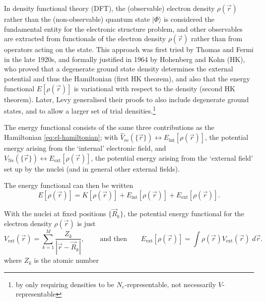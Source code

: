 \documentclass[11pt,bibliography=totoc,index=totoc]{scrbook}   %
\begin{document}
In density functional theory (DFT), the (observable) electron density $\rho(\vec{r})$ rather than the (non-observable) quantum state $|\Phi\rangle$ is considered the fundamental entity for the electronic structure problem, and other observables are extracted from functionals of the electron density $\rho(\vec{r})$ rather than from operators acting on the state.
This approach was first tried by Thomas\cite{Thomas:1927} and Fermi\cite{Fermi:1928} in the late 1920s, 
and formally justified in 1964 by Hohenberg and Kohn (HK), who proved that a degenerate ground state density determines the external potential and thus the Hamiltonian (first HK theorem),
and also that the energy functional $E[\rho(\vec{r})]$ is variational with respect to the density (second HK theorem).\cite{HohenbergKohn:1964}
Later, Levy generalised their proofs to also include degenerate ground states, and to allow a larger set of trial densities.\footnote{by only requiring densities to be $N_e$-representable, not necessarily $V$-representable}\cite{Levy:1979,Levy:1982}

The energy functional consists of the same three contributions as the Hamiltonian \eqref{eq:el-hamiltonian}; with $\hat{V}_{\text{ee}}(\{\vec{r}\}) \leftrightarrow E_{\text{int}}[\rho(\vec{r})]$, the potential energy arising from the `internal' electronic field, and $V_{\text{Ne}}(\{\vec{r}\}) \leftrightarrow E_{\text{ext}}[\rho(\vec{r})]$, the potential energy arising from the `external field' set up by the nuclei (and in general other external fields).

The energy functional can then be written
\begin{equation}
    E[\rho(\vec{r})] = K[\rho(\vec{r})] + E_{\text{int}}[\rho(\vec{r})] + E_{\text{ext}}[\rho(\vec{r})].
    \label{eq:energy_functional}
\end{equation}

With the nuclei at fixed positions $\{\vec{R}_k\}$, the potential energy functional for the electron density $\rho(\vec{r})$ is just
\begin{equation}
  V_{\text{ext}}(\vec{r}) = \sum_{k=1}^M \frac{Z_k}{|\vec{r}-\vec{R}_k|},\
    \qquad\text{and then}\qquad
    E_{\text{ext}}[\rho(\vec{r})] = \int\rho(\vec{r})V_{\text{ext}}(\vec{r})\;d\vec{r}.
  \label{eq:nuclei-pot}
\end{equation}
where $Z_k$ is the atomic number
\end{document}

